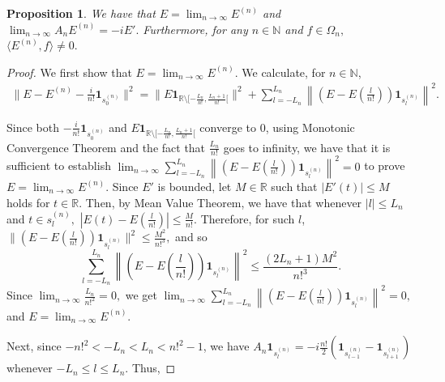 \documentclass[10pt,a4paper]{amsart}
\newtheorem{prop}[thm]{Proposition}
\def \LL{\langle}
\def \RR{\rangle}
\begin{document}
\begin{prop}\label{proposition_gaussian_finite}
	We have that $E=\lim_{n\rightarrow\infty}E^{(n)}$ and  $\lim_{n\rightarrow\infty}A_n E^{(n)}=-iE'.$ Furthermore, for any $n\in\mathbb{N}$ and $f\in\Omega_n,$ $\LL E^{(n)}, f\RR\neq 0.$ 
\end{prop}
\begin{proof}
	We first show that $E=\lim_{n\rightarrow\infty} E^{(n)}.$ We calculate, for $n\in\mathbb{N}$,
	\begin{align*}
		\|E-E^{(n)}-\frac{i}{n!}\mathbf{1}_{s_0^{(n)}}\|^2=\|E\mathbf{1}_{\mathbb{R}\setminus[-\frac{L_n}{n!},\frac{L_n+1}{n!}[}\|^2+\sum_{l=-L_n}^{L_n}\left\|\left(E-E\left(\frac{l}{n!}\right)\right)\mathbf{1}_{s_l^{(n)}}\right\|^2.
	\end{align*}
	
	Since both $-\frac{i}{n!}\mathbf{1}_{s_0^{(n)}}$ and $E\mathbf{1}_{\mathbb{R}\setminus[-\frac{L_n}{n!},\frac{L_n+1}{n!}[}$ converge to $0$, using Monotonic Convergence Theorem and the fact that $\frac{L_n}{n!}$ goes to infinity, we have that it is sufficient to establish $\lim_{n\rightarrow\infty}\sum_{l=-L_n}^{L_n}\left\|\left(E-E\left(\frac{l}{n!}\right)\right)\mathbf{1}_{s_l^{(n)}}\right\|^2=0$ to prove $E=\lim_{n\rightarrow\infty} E^{(n)}.$ Since $E'$ is bounded, let $M\in\mathbb{R}$ such that $|E'(t)|\leq M$ holds for $t\in\mathbb{R}.$ Then, by Mean Value Theorem, we have that whenever $|l|\leq L_n$ and $t\in s_l^{(n)}, $ $|E(t)-E(\frac{l}{n!})|\leq \frac{M}{n!}.$ Therefore, for such $l$, $\|\left(E-E\left(\frac{l}{n!}\right)\right)\mathbf{1}_{s_l^{(n)}} \|^2\leq \frac{M^2}{n!^3},$ and so $$\sum_{l=-L_n}^{L_n}\left\|\left(E-E\left(\frac{l}{n!}\right)\right)\mathbf{1}_{s_l^{(n)}}\right\|^2\leq\frac{(2L_n+1)M^2}{n!^3}. $$ Since $\lim_{n\rightarrow\infty}\frac{L_n}{n!^2}=0,$ we get $\lim_{n\rightarrow\infty}\sum_{l=-L_n}^{L_n}\left\|\left(E-E\left(\frac{l}{n!}\right)\right)\mathbf{1}_{s_l^{(n)}}\right\|^2=0,$ and $E=\lim_{n\rightarrow\infty}E^{(n)}.$
	
	Next, since $-n!^2<-L_n<L_n<n!^2-1$, we have $A_n\mathbf{1}_{s_l^{(n)}}=-i\frac{n!}{2}(\mathbf{1}_{s_{l-1}^{(n)}}-\mathbf{1}_{s_{l+1}^{(n)}})$ whenever $-L_n\leq l\leq L_n.$ Thus, 
	

\end{proof}
\end{document}
